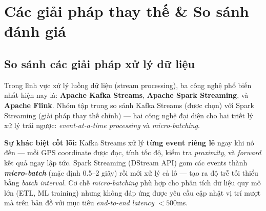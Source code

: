 \section{Các giải pháp thay thế \& So sánh đánh giá}
\label{sec:alternative-solutions}

\subsection{So sánh các giải pháp xử lý dữ liệu}
\label{sec:processing-comparison}

Trong lĩnh vực xử lý luồng dữ liệu (stream processing), ba công nghệ phổ biến nhất hiện nay là: \textbf{Apache Kafka Streams}, \textbf{Apache Spark Streaming}, và \textbf{Apache Flink}. Nhóm tập trung so sánh Kafka Streams (được chọn) với Spark Streaming (giải pháp thay thế chính) — hai công nghệ đại diện cho hai triết lý xử lý trái ngược: \textit{event-at-a-time processing} và \textit{micro-batching}.

\bigskip
\noindent
\textbf{Sự khác biệt cốt lõi:} Kafka Streams xử lý \textbf{từng event riêng lẻ} ngay khi nó đến — mỗi GPS coordinate được đọc, tính tốc độ, kiểm tra \textit{proximity}, và \textit{forward} kết quả ngay lập tức. Spark Streaming (DStream API) gom các events thành \textbf{\textit{micro-batch}} (mặc định 0.5--2 giây) rồi mới xử lý cả lô — tạo ra độ trễ tối thiểu bằng \textit{batch interval}. Cơ chế \textit{micro-batching} phù hợp cho phân tích dữ liệu quy mô lớn (ETL, ML training) nhưng không đáp ứng được yêu cầu cập nhật vị trí mượt mà trên bản đồ với mục tiêu \textit{end-to-end latency} $< 500$ms.

